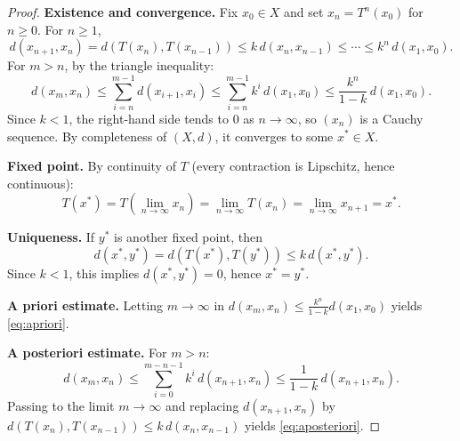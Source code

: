 \begin{proof}
\textbf{Existence and convergence.}
Fix $x_0 \in X$ and set $x_n = T^n(x_0)$ for $n \geq 0$. For $n \geq 1$,
\[
    d(x_{n+1}, x_n) = d(T(x_n), T(x_{n-1})) \leq k \, d(x_n, x_{n-1})
    \leq \cdots \leq k^n \, d(x_1, x_0).
\]
For $m > n$, by the triangle inequality:
\[
    d(x_m, x_n) \leq \sum_{i=n}^{m-1} d(x_{i+1}, x_i)
    \leq \sum_{i=n}^{m-1} k^i \, d(x_1, x_0)
    \leq \frac{k^n}{1 - k} \, d(x_1, x_0).
\]
Since $k < 1$, the right-hand side tends to $0$ as $n \to \infty$, so $(x_n)$
is a Cauchy sequence. By completeness of $(X, d)$, it converges to some
$x^* \in X$.

\textbf{Fixed point.}
By continuity of $T$ (every contraction is Lipschitz, hence continuous):
\[
    T(x^*) = T\left(\lim_{n \to \infty} x_n\right) = \lim_{n \to \infty} T(x_n)
    = \lim_{n \to \infty} x_{n+1} = x^*.
\]

\textbf{Uniqueness.}
If $y^*$ is another fixed point, then
\[
    d(x^*, y^*) = d(T(x^*), T(y^*)) \leq k \, d(x^*, y^*).
\]
Since $k < 1$, this implies $d(x^*, y^*) = 0$, hence $x^* = y^*$.

\textbf{A priori estimate.}
Letting $m \to \infty$ in $d(x_m, x_n) \leq \frac{k^n}{1-k} d(x_1, x_0)$
yields \eqref{eq:apriori}.

\textbf{A posteriori estimate.}
For $m > n$:
\[
    d(x_m, x_n) \leq \sum_{i=0}^{m-n-1} k^i \, d(x_{n+1}, x_n)
    \leq \frac{1}{1-k} \, d(x_{n+1}, x_n).
\]
Passing to the limit $m \to \infty$ and replacing $d(x_{n+1}, x_n)$ by
$d(T(x_n), T(x_{n-1})) \leq k \, d(x_n, x_{n-1})$ yields
\eqref{eq:aposteriori}.
\end{proof}

\begin{center}
\end{center}


